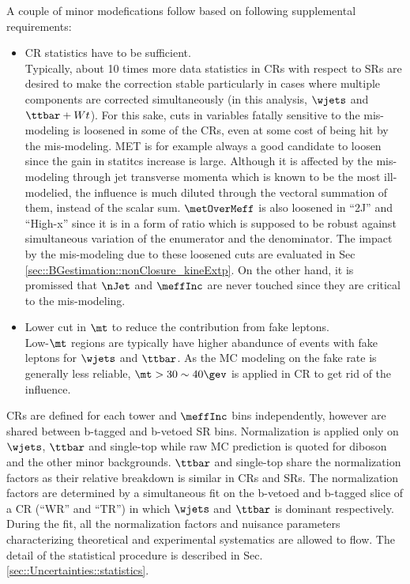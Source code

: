 A couple of minor modefications follow based on following supplemental requirements:
\begin{itemize}
\item CR statistics have to be sufficient. \\
Typically, about 10 times more data statistics in CRs with respect to SRs are desired to make the correction stable particularly in cases where multiple components are corrected simultaneously (in this analysis, $\wjets$ and $\ttbar+Wt$). 
For this sake, cuts in variables fatally sensitive to the mis-modeling is loosened in some of the CRs, even at some cost of being hit by the mis-modeling.
MET is for example always a good candidate to loosen since the gain in statitcs increase is large.
Although it is affected by the mis-modeling through jet transverse momenta which is known to be the most ill-modelied, 
the influence is much diluted through the vectoral summation of them, instead of the scalar sum. 
$\metOverMeff$ is also loosened in ``2J'' and ``High-x'' since it is in a form of ratio which is supposed to be robust against simultaneous variation of the enumerator and the denominator.
The impact by the mis-modeling due to these loosened cuts are evaluated in Sec \ref{sec::BGestimation::nonClosure_kineExtp}.
On the other hand, it is promissed that $\nJet$ and $\meffInc$ are never touched since they are critical to the mis-modeling. \\
%
\item Lower cut in $\mt$ to reduce the contribution from fake leptons. \\
Low-$\mt$ regions are typically have higher abandunce of events with fake leptons for $\wjets$ and $\ttbar$.
As the MC modeling on the fake rate is generally less reliable, $\mt > 30 \sim 40 \gev$ is applied in CR to get rid of the influence. 
\end{itemize}

CRs are defined for each tower and $\meffInc$ bins independently, however are shared between b-tagged and b-vetoed SR bins.  Normalization is applied only on $\wjets$, $\ttbar$ and single-top while raw MC prediction is quoted for diboson and the other minor backgrounds. $\ttbar$ and single-top share the normalization factors as their relative breakdown is similar in CRs and SRs. 
The normalization factors are determined by a simultaneous fit on the b-vetoed and b-tagged slice of a CR (``WR'' and ``TR'') in which $\wjets$ and $\ttbar$ is dominant respectively. During the fit, all the normalization factors and nuisance parameters characterizing theoretical and experimental systematics are allowed to flow. The detail of the statistical procedure is described in Sec. \ref{sec::Uncertainties::statistics}. \\

